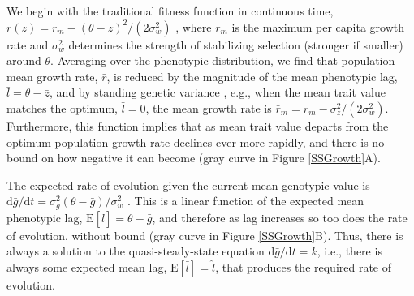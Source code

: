 \documentclass[12pt,letterpaper]{article} %
\begin{document}
We begin with the traditional fitness function in continuous time,  $r(z) = r_m - (\theta - z)^2 / (2\sigma_w^2)$ \citep[][equation 1]{Lynch1993}, where $r_m$ is the maximum per capita growth rate and $\sigma_w^2$ determines the strength of stabilizing selection (stronger if smaller) around $\theta$.
Averaging over the phenotypic distribution, we find that population mean growth rate, $\bar{r}$, is reduced by the magnitude of the mean phenotypic lag, $\bar{l} = \theta - \bar{z} $, and by standing genetic variance \citep{Lande1996}, e.g., when the mean trait value matches the optimum, $\bar{l}=0$, the mean growth rate is $\bar{r}_m = r_m - \sigma_z^2/(2\sigma_w^2)$.
Furthermore, this function implies that as mean trait value departs from the optimum population growth rate declines ever more rapidly, and there is no bound on how negative it can become (gray curve in Figure \ref{SSGrowth}A).


The expected rate of evolution given the current mean genotypic value is $\mathrm{d}\bar{g}/\mathrm{d}t = \sigma_g^2 (\theta - \bar{g}) / \sigma_w^2$ \citep[][equation 5]{Lynch1993}.
This is a linear function of the expected mean phenotypic lag, $\mathrm{E}[\bar{l}] = \theta - \bar{g}$, and therefore as lag increases so too does the rate of evolution, without bound (gray curve in Figure \ref{SSGrowth}B).
Thus, there is always a solution to the quasi-steady-state equation $\mathrm{d}\bar{g}/\mathrm{d}t  = k$, i.e., there is always some expected mean lag, $\mathrm{E}[\bar{l}]=\hat{l}$, that produces the required rate of evolution. %
\end{document}
